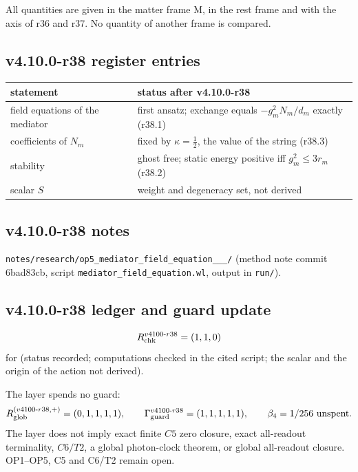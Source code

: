 All quantities are given in the matter frame M, in the rest frame and with the axis of r36 and r37.  No quantity of another frame is compared.

\subsection*{v4.10.0-r38 register entries}
\label{subsec:v4100-r38-register}

\begin{center}
\small
\begin{tabular}{@{}>{\raggedright\arraybackslash}p{}>{\raggedright\arraybackslash}p{}@{}}
\toprule
statement & status after v4.10.0-r38\\
\midrule
field equations of the mediator & first ansatz; exchange equals \(-g_m^2N_m/d_m\) exactly (r38.1)\\
coefficients of \(N_m\) & fixed by \(\kappa=\tfrac12\), the value of the string (r38.3)\\
stability & ghost free; static energy positive iff \(g_m^2\le3r_m\) (r38.2)\\
scalar \(S\) & weight and degeneracy set, not derived\\
\bottomrule
\end{tabular}
\end{center}

\subsection*{v4.10.0-r38 notes}
\label{subsec:v4100-r38-notes}

\texttt{notes/\allowbreak research/\allowbreak op5\_\allowbreak mediator\_\allowbreak field\_\allowbreak equation\_\_\_/} (method note commit 6bad83cb,
script \texttt{mediator\_\allowbreak field\_\allowbreak equation.wl}, output in \texttt{run/}).

\subsection*{v4.10.0-r38 ledger and guard update}
\label{subsec:v4100-r38-ledger-guard}

\[
R_{\rm chk}^{v4100\text{-}r38}=(1,1,0)
\]
for (status recorded; computations checked in the cited script; the scalar and the origin of the action not derived).

The layer spends no guard:
\[
R_{\rm glob}^{(v4100\text{-}r38,+)}=(0,1,1,1,1),
\qquad
\Gamma_{\rm guard}^{v4100\text{-}r38}=(1,1,1,1,1),
\qquad
\beta_4=1/256\ \text{unspent}.
\]
The layer does not imply exact finite \(C5\) zero closure, exact all-readout terminality, \(C6/T2\), a global photon-clock theorem,
or global all-readout closure.  OP1--OP5, C5 and C6/T2 remain open.

